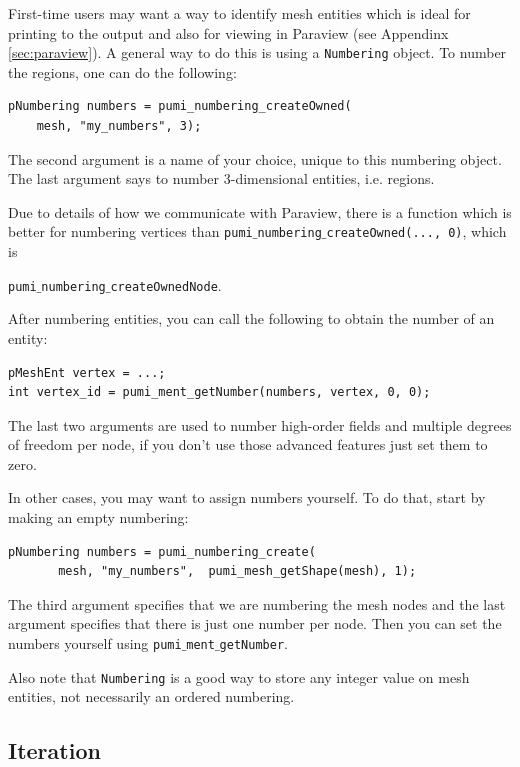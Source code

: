 \documentclass{article}
\begin{document}
First-time users may want a way to identify mesh entities which
is ideal for printing to the output and also for viewing in
Paraview (see Appendinx \ref{sec:paraview}).
A general way to do this is using a \texttt{Numbering} object.
To number the regions, one can do the following:

\begin{lstlisting}
pNumbering numbers = pumi_numbering_createOwned(
    mesh, "my_numbers", 3);
\end{lstlisting}

The second argument is a name of your choice, unique to this numbering object.
The last argument says to number 3-dimensional entities, i.e. regions.

Due to details of how we communicate with Paraview, there is a
function which is better for numbering vertices than
\texttt{pumi$\_$numbering$\_$createOwned(..., 0)}, which is {\texttt{pumi$\_$numbering$\_$createOwnedNode}.

After numbering entities, you can call the following to obtain the number of an
entity:

\begin{lstlisting}
pMeshEnt vertex = ...;
int vertex_id = pumi_ment_getNumber(numbers, vertex, 0, 0);
\end{lstlisting}

The last two arguments are used to number high-order fields and
multiple degrees of freedom per node, if you don't use those
advanced features just set them to zero.

In other cases, you may want to assign numbers yourself.
To do that, start by making an empty numbering:

\begin{lstlisting}
pNumbering numbers = pumi_numbering_create(
       mesh, "my_numbers",  pumi_mesh_getShape(mesh), 1);
\end{lstlisting}

The third argument specifies that we are numbering the mesh
nodes and the last argument specifies that there is just one
number per node.
Then you can set the numbers yourself using \texttt{pumi$\_$ment$\_$getNumber}.

Also note that \texttt{Numbering} is a good way to store
any integer value on mesh entities, not necessarily an
ordered numbering.

\subsection{Iteration}

}
\end{document}
